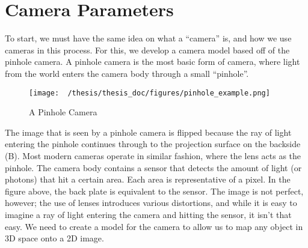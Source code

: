 \documentclass[12pt,twoside]{reedthesis}
\begin{document}
\section{Camera Parameters}
To start, we must have the same idea on what a “camera” is, and how we use cameras in this process. For this, we develop a camera model based off of the pinhole camera. A pinhole camera is the most basic form of camera, where light from the world enters the camera body through a small “pinhole”. 

\begin{figure}[h]
	   
	       \centering
	    \texttt{[image: ~/thesis/thesis\_doc/figures/pinhole\_example.png]}
	     \caption{A Pinhole Camera}
	 \label{A Pinhole Camera}
	\end{figure}

The image that is seen by a pinhole camera is flipped because the ray of light entering the pinhole continues through to the projection surface on the backside (B). Most modern cameras operate in similar fashion, where the lens acts as the pinhole. The camera body contains a sensor that detects the amount of light (or photons) that hit a certain area. Each area is representative of a pixel. In the figure above, the back plate is equivalent to the sensor. The image is not perfect, however; the use of lenses introduces various distortions, and while it is easy to imagine a ray of light entering the camera and hitting the sensor, it isn’t that easy. We need to create a model for the camera to allow us to map any object in 3D space onto a 2D image.
\end{document}
